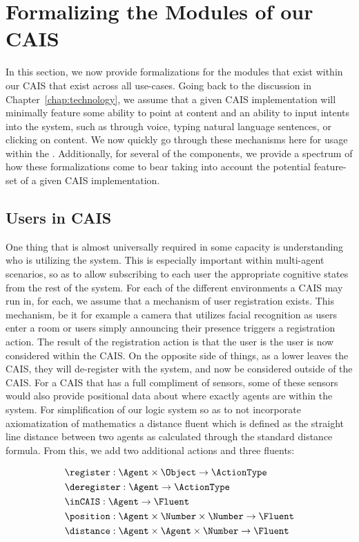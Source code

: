 \section{Formalizing the Modules of our CAIS}

In this section, we now provide formalizations for the modules that exist within our
CAIS that exist across all use-cases. Going back to the discussion in 
Chapter~\ref{chap:technology}, we assume that a given CAIS implementation will minimally
feature some ability to point at content and an ability to input intents into the system,
such as through voice, typing natural language sentences, or clicking on content. We now
quickly go through these mechanisms here for usage within the \CEC. Additionally, for
several of the components, we provide a spectrum of how these formalizations come to bear
taking into account the potential feature-set of a given CAIS implementation.

\subsection{Users in CAIS}

One thing that is almost universally required in some capacity is understanding who is
utilizing the system. This is especially important within multi-agent scenarios, so
as to allow subscribing to each user the appropriate cognitive states from the rest
of the system. For each of the different environments a CAIS may run in, for each,
we assume that a mechanism of user registration exists. This mechanism, be it for
example a camera that utilizes facial recognition as users enter a room or users
simply announcing their presence triggers a registration action. The result of the
registration action is that the user is the user is now considered within the CAIS.
On the opposite side of things, as a lower leaves the CAIS, they will de-register
with the system, and now be considered outside of the CAIS. For a CAIS that has a
full compliment of sensors, some of these sensors would also provide positional
data about where exactly agents are within the system. For simplification of our
logic system so as to not incorporate axiomatization of mathematics a distance
fluent which is defined as the straight line distance between two agents as calculated
through the standard distance formula. From this, we add two
additional actions and three fluents:

\begin{equation*}
\begin{aligned}
  & \register: \Agent \times \Object \rightarrow \ActionType \\
  & \deregister: \Agent \rightarrow \ActionType \\
  & \inCAIS: \Agent \rightarrow \Fluent \\
  & \position: \Agent \times \Number \times \Number \rightarrow \Fluent \\
  & \distance: \Agent \times \Agent \times \Number \rightarrow \Fluent \\
\end{aligned}
\end{equation*}


